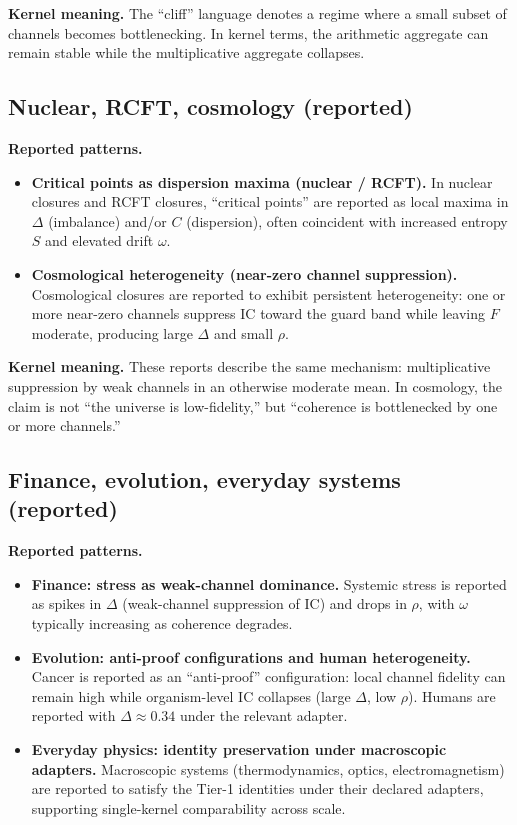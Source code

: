 \documentclass[
  aps,
  prd,
  preprint,
  superscriptaddress,
  nofootinbib,
  floatfix
]{revtex4-2}
\newcommand{\IC}{\mathrm{IC}}
\begin{document}
\noindent\textbf{Kernel meaning.}
The ``cliff'' language denotes a regime where a small subset of channels becomes bottlenecking.
In kernel terms, the arithmetic aggregate can remain stable while the multiplicative aggregate collapses.

\subsection{Nuclear, RCFT, cosmology (reported)}
\label{subsec:nuclear_rcft_cosmo}

\noindent\textbf{Reported patterns.}
\begin{itemize}[leftmargin=1.6em]
  \item \textbf{Critical points as dispersion maxima (nuclear / RCFT).}
  In nuclear closures and RCFT closures, ``critical points'' are reported as local maxima in $\Delta$ (imbalance) and/or $C$
  (dispersion), often coincident with increased entropy $S$ and elevated drift $\omega$.
  \item \textbf{Cosmological heterogeneity (near-zero channel suppression).}
  Cosmological closures are reported to exhibit persistent heterogeneity: one or more near-zero channels suppress $\IC$
  toward the guard band while leaving $F$ moderate, producing large $\Delta$ and small $\rho$.
\end{itemize}

\noindent\textbf{Kernel meaning.}
These reports describe the same mechanism: multiplicative suppression by weak channels in an otherwise moderate mean.
In cosmology, the claim is not ``the universe is low-fidelity,'' but ``coherence is bottlenecked by one or more channels.''

\subsection{Finance, evolution, everyday systems (reported)}
\label{subsec:finance_evolution_everyday}

\noindent\textbf{Reported patterns.}
\begin{itemize}[leftmargin=1.6em]
  \item \textbf{Finance: stress as weak-channel dominance.}
  Systemic stress is reported as spikes in $\Delta$ (weak-channel suppression of $\IC$) and drops in $\rho$,
  with $\omega$ typically increasing as coherence degrades.
  \item \textbf{Evolution: anti-proof configurations and human heterogeneity.}
  Cancer is reported as an ``anti-proof'' configuration: local channel fidelity can remain high while organism-level $\IC$
  collapses (large $\Delta$, low $\rho$). Humans are reported with $\Delta\approx 0.34$ under the relevant adapter.
  \item \textbf{Everyday physics: identity preservation under macroscopic adapters.}
  Macroscopic systems (thermodynamics, optics, electromagnetism) are reported to satisfy the Tier-1 identities under their
  declared adapters, supporting single-kernel comparability across scale.
\end{itemize}
\end{document}
